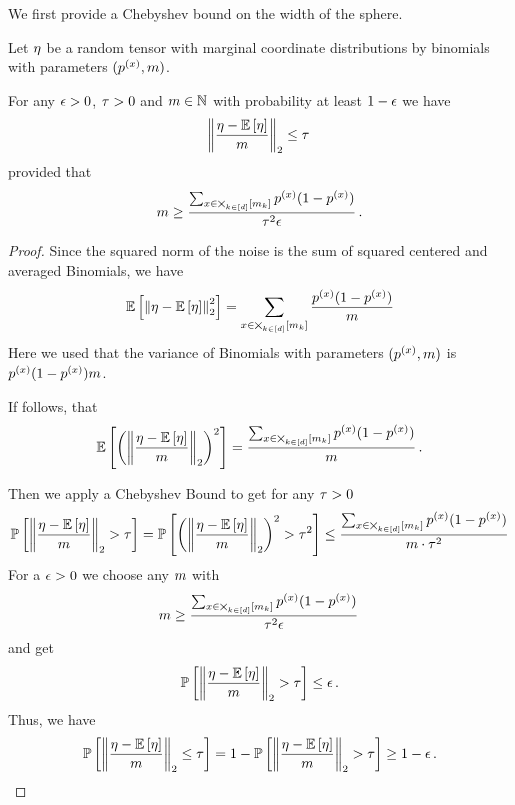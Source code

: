 We first provide a Chebyshev bound on the width of the sphere.

\begin{theorem}\label{the:sphereBoundVariance}
	Let $\eta$ be a random tensor with marginal coordinate distributions by binomials with parameters $(p^{(x)},m)$.

	For any $\epsilon>0$, $\tau>0$ and $m\in\mathbb{N}$ with probability at least $1-\epsilon$ we have
		\[ \left\|\frac{\eta-\mathbb{E}\left[\eta\right]}{m}\right\|_{2} \leq   \tau \, \]
	provided that
		\[ m \geq  \frac{ \sum_{x\in\bigtimes_{k\in[d]}[m_{k}]} p^{(x)}(1-p^{(x)})}{\tau^2 \epsilon} \, . \]
\end{theorem}
\begin{proof}
	Since the squared norm of the noise is the sum of squared centered and averaged Binomials, we have
		\[  \mathbb{E}\left[\left\|\eta-\mathbb{E}\left[\eta\right]\right\|_{2}^2\right]  
		= \sum_{x\in\bigtimes_{k\in[d]}[m_{k}]} \frac{p^{(x)}(1-p^{(x)})}{m} \]
	Here we used that the variance of Binomials with parameters $(p^{(x)},m)$ is $p^{(x)}(1-p^{(x)}) m$.
	
	If follows, that 
		\[ \mathbb{E}\left[\left(\left\|\frac{\eta-\mathbb{E}\left[\eta\right]}{m}\right\|_{2}\right)^2\right] =  \frac{ \sum_{x\in\bigtimes_{k\in[d]}[m_{k}]} p^{(x)}(1-p^{(x)})}{m} \, . \]
	
	Then we apply a Chebyshev Bound to get for any $\tau>0$
	\begin{align}
		\mathbb{P}\left[\left\|\frac{\eta-\mathbb{E}\left[\eta\right]}{m}\right\|_{2} > \tau\right] 
		= \mathbb{P}\left[\left(\left\|\frac{\eta-\mathbb{E}\left[\eta\right]}{m}\right\|_{2}\right)^2 > \tau^2\right] 
		\leq \frac{ \sum_{x\in\bigtimes_{k\in[d]}[m_{k}]} p^{(x)}(1-p^{(x)})}{m \cdot \tau^2}
	\end{align} 
	For a $\epsilon>0$ we choose any $m$ with
		\[ m \geq  \frac{ \sum_{x\in\bigtimes_{k\in[d]}[m_{k}]} p^{(x)}(1-p^{(x)})}{\tau^2 \epsilon} \, \]
	and get 
	\begin{align}
		\mathbb{P}\left[\left\|\frac{\eta-\mathbb{E}\left[\eta\right]}{m}\right\|_{2} > \tau\right] \leq \epsilon \, . 
	\end{align} 
	Thus, we have 
	\begin{align}
		\mathbb{P}\left[\left\|\frac{\eta-\mathbb{E}\left[\eta\right]}{m}\right\|_{2} \leq \tau\right] = 1 - \mathbb{P}\left[\left\|\frac{\eta-\mathbb{E}\left[\eta\right]}{m}\right\|_{2} > \tau\right]  \geq 1-\epsilon \, . 
	\end{align} 
\end{proof}


